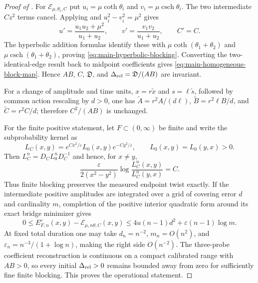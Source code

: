 \documentclass[11pt]{article}
\numberwithin{equation}{section}
\theoremstyle{definition}
\theoremstyle{remark}
\begin{document}
\begin{proof}[Proof of ]
For $\mathcal E_{\mu,\theta_i,C}$ put
$u_i=\mu\coth\theta_i$ and $v_i=\mu\operatorname{csch}\theta_i$.
The two intermediate $Cz^2$ terms cancel.  Applying
 and $u_i^2-v_i^2=\mu^2$ gives
\begin{equation}
 u'=\frac{u_1u_2+\mu^2}{u_1+u_2},\qquad
 v'=\frac{v_1v_2}{u_1+u_2},\qquad C'=C.
\end{equation}
The hyperbolic addition formulas identify these with
$\mu\coth(\theta_1+\theta_2)$ and
$\mu\operatorname{csch}(\theta_1+\theta_2)$, proving
\eqref{eq:main-hyperbolic-blocking}.  Converting the two-identical-edge result
back to midpoint coefficients gives \eqref{eq:main-homogeneous-block-map}.
Hence $AB$, $C$, $\mathfrak D$, and
$\Delta_{\rm rel}=\mathfrak D/(AB)$ are invariant.

For a change of amplitude and time units, $x=r\widetilde x$ and
$s=\ell\widetilde s$, followed by common action rescaling by $d>0$, one has
$\widetilde A=r^2A/(d\ell)$,
$\widetilde B=r^2\ell B/d$, and $\widetilde C=r^2C/d$; therefore
$C^2/(AB)$ is unchanged.

For the finite positive statement, let $F\subset(0,\infty)$ be finite and
write the subprobability kernel as
\begin{equation}
 L_C(x,y)=e^{Cx^2/\varepsilon}L_0(x,y)e^{-Cy^2/\varepsilon},
 \qquad L_0(x,y)=L_0(y,x)>0.
 \label{eq:supp-finite-twist-similarity}
\end{equation}
Then $L_C^n=D_CL_0^nD_C^{-1}$ and hence, for $x\ne y$,
\begin{equation}
 \frac{\varepsilon}{2(x^2-y^2)}
 \log\frac{L_C^n(x,y)}{L_C^n(y,x)}=C.
 \label{eq:supp-finite-twist-read}
\end{equation}
Thus finite blocking preserves the measured endpoint twist exactly.  If the
intermediate positive amplitudes are integrated over a grid of covering error
$d$ and cardinality $m$, completion of the positive interior quadratic form
around its exact bridge minimizer gives
\begin{equation}
 0\le E_{F,n}^{\varepsilon}(x,y)-
 \mathcal E_{\mu,n\theta,C}(x,y)
 \le4u(n-1)d^2+\varepsilon(n-1)\log m.
 \label{eq:supp-finite-block-error}
\end{equation}
At fixed total duration one may take $d_n=n^{-2}$,
$m_n=O(n^2)$, and $\varepsilon_n=n^{-3}/(1+\log n)$, making the right side
$O(n^{-2})$.  The three-probe coefficient reconstruction is continuous on a
compact calibrated range with $AB>0$, so every initial
$\Delta_{\rm rel}>0$ remains bounded away from zero for sufficiently fine
finite blocking.  This proves the operational statement.
\end{proof}
\end{document}
